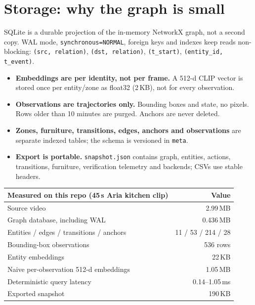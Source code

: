\documentclass[10pt,a4paper]{article}
\newcommand{\code}[1]{\texttt{\small #1}}
\begin{document}
\section{Storage: why the graph is small}

SQLite is a durable projection of the in-memory NetworkX graph, not a second copy. WAL mode,
\code{synchronous=NORMAL}, foreign keys and indexes keep reads non-blocking:
\code{(src, relation)}, \code{(dst, relation)}, \code{(t\_start)}, \code{(entity\_id, t\_event)}.

\begin{itemize}[leftmargin=1.2em,itemsep=1pt]
  \item \textbf{Embeddings are per identity, not per frame.} A 512-d CLIP vector is stored once per
        entity/zone as float32 (2\,KB), not for every observation.
  \item \textbf{Observations are trajectories only.} Bounding boxes and state, no pixels. Rows older
        than 10 minutes are purged. Anchors are never deleted.
  \item \textbf{Zones, furniture, transitions, edges, anchors and observations} are separate indexed
        tables; the schema is versioned in \code{meta}.
  \item \textbf{Export is portable.} \code{snapshot.json} contains graph, entities, actions,
        transitions, furniture, verification telemetry and backends; CSVs use stable headers.
\end{itemize}

\begin{center}
\small
\begin{tabularx}{\linewidth}{@{}L r@{}}
\toprule
\textbf{Measured on this repo (45\,s Aria kitchen clip)} & \textbf{Value} \\
\midrule
Source video & 2.99\,MB \\
Graph database, including WAL & 0.436\,MB \\
Entities / edges / transitions / anchors & 11 / 53 / 214 / 28 \\
Bounding-box observations & 536 rows \\
Entity embeddings & 22\,KB \\
Naive per-observation 512-d embeddings & 1.05\,MB \\
Deterministic query latency & 0.14--1.05\,ms \\
Exported snapshot & 190\,KB \\
\bottomrule
\end{tabularx}
\end{center}
\end{document}
